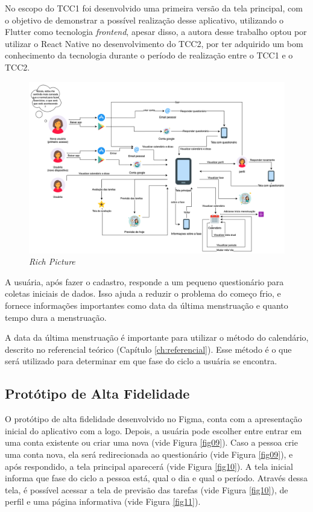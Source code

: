 No escopo do TCC1 foi desenvolvido uma primeira versão da tela principal, com o objetivo de demonstrar a possível 
realização desse aplicativo, utilizando o Flutter como tecnologia \emph{frontend}, apesar disso, a autora desse trabalho 
optou por utilizar o React Native no desenvolvimento do TCC2, por ter adquirido um bom conhecimento da tecnologia durante o período de realização entre o TCC1 e o TCC2.
 
\begin{figure}[ht]
    \centering
    \includegraphics[keepaspectratio=true,scale=0.37]{figuras/richPicture.png}
    \caption{\emph{Rich Picture}}
        \label{fig08}
\end{figure}

A usuária, após fazer o cadastro, responde a um pequeno 
questionário para coletas iniciais de dados. Isso ajuda a reduzir 
o problema do começo frio, e fornece informações importantes
como data da última menstruação e quanto tempo dura a menstruação.

A data da última menstruação é importante para utilizar o 
método do calendário, descrito no referencial teórico (Capítulo \ref{ch:referencial}). 
Esse método é o que será utilizado para determinar em que 
fase do ciclo a usuária se encontra.

\subsection{Protótipo de Alta Fidelidade}

O protótipo de alta fidelidade desenvolvido no Figma, conta com a apresentação 
inicial do aplicativo com a logo. Depois, a usuária 
pode escolher entre entrar em uma conta existente ou criar 
uma nova (vide Figura \ref{fig09}). Caso a pessoa crie uma conta 
nova, ela será 
redirecionada ao questionário (vide Figura \ref{fig09}), e após 
respondido, a 
tela principal aparecerá (vide Figura \ref{fig10}). A tela inicial informa que 
fase do ciclo a pessoa está, qual o dia 
e qual o período. Através dessa tela, é possível acessar 
a tela de previsão das tarefas (vide Figura \ref{fig10}), de perfil
e uma página informativa (vide Figura \ref{fig11}).

